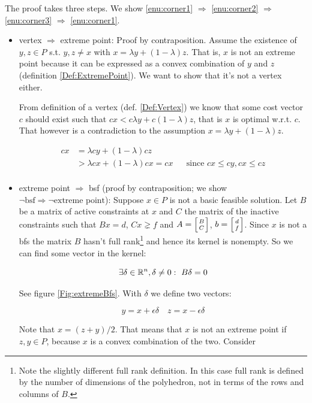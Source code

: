 \begin{pr} The proof takes three steps. We show \ref{enu:corner1} $\Rightarrow$ \ref{enu:corner2} $\Rightarrow$ \ref{enu:corner3} $\Rightarrow$ \ref{enu:corner1}.
\begin{itemize}
\item vertex $\Rightarrow$ extreme point: Proof by contraposition. Assume the existence of $y,z \in P$ s.t. $y,z\neq x$ with $x= \lambda y + (1-\lambda )z$. That is, $x$ is not an extreme point because it can be expressed as a convex combination of $y$ and $z$ (definition \ref{Def:ExtremePoint}). We want to show that it's not a vertex either.

From definition of a vertex (def. \ref{Def:Vertex}) we know that some cost vector $c$ should exist such that $c x < c \lambda y  + c (1-\lambda) z$, that is $x$ is optimal w.r.t. $c$. That however is a contradiction to the assumption $x= \lambda y + (1-\lambda )z$.

\begin{align*}
cx &= \lambda cy +(1-\lambda)cz\\
   &> \lambda cx + (1-\lambda)cx = cx && \text{since }cx\leq cy, cx\leq cz\\
\end{align*}

\item extreme point $\Rightarrow$ bsf (proof by contraposition; we show $\neg \text{bsf} \Rightarrow \neg \text{extreme point}$): Suppose $x\in P$ is not a basic feasible solution. Let $B$ be a matrix of active constraints at $x$ and $C$ the matrix of the inactive constraints such that $Bx=d$, $Cx\gneq f$ and $A = \left[B\atop C\right]$, $b=\left[d\atop f\right]$. Since $x$ is not a bfs the matrix $B$ hasn't full rank\footnote{Note the slightly different full rank definition. In this case full rank is defined by the number of dimensions of the polyhedron, not in terms of the rows and columns of $B$.} and hence its kernel is nonempty. So we can find some vector in the kernel:

\[\exists \delta \in \R^n, \delta \neq 0:\ B\delta =0\]

See figure \ref{Fig:extremeBfs}. With $\delta$ we define two vectors:

\[y=x+\epsilon \delta \quad z = x-\epsilon \delta\]

Note that $x=(z+y)/2$. That means that $x$ is not an extreme point if $z,y \in P$, because $x$ is a convex combination of the two. Consider 


\end{itemize}
\end{pr}
